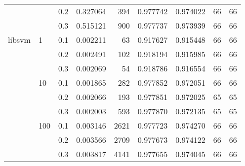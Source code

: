 \begin{table}[H]
\begin{tabular}{lllrrrrrr}
       &     & 0.2 &  0.327064 &     394 &  0.977742 &  0.974022 &          66 &        66 \\
       &     & 0.3 &  0.515121 &     900 &  0.977737 &  0.973939 &          66 &        66 \\
libsvm & 1   & 0.1 &  0.002211 &      63 &  0.917627 &  0.915448 &          66 &        66 \\
       &     & 0.2 &  0.002491 &     102 &  0.918194 &  0.915985 &          66 &        66 \\
       &     & 0.3 &  0.002069 &      54 &  0.918786 &  0.916554 &          66 &        66 \\
       & 10  & 0.1 &  0.001865 &     282 &  0.977852 &  0.972051 &          66 &        66 \\
       &     & 0.2 &  0.002066 &     193 &  0.977851 &  0.972025 &          65 &        65 \\
       &     & 0.3 &  0.002003 &     593 &  0.977870 &  0.972135 &          65 &        65 \\
       & 100 & 0.1 &  0.003146 &    2621 &  0.977723 &  0.974270 &          66 &        66 \\
       &     & 0.2 &  0.003566 &    2709 &  0.977673 &  0.974122 &          66 &        66 \\
       &     & 0.3 &  0.003817 &    4141 &  0.977655 &  0.974045 &          66 &        66 \\
\bottomrule
\end{tabular}
\end{table}
